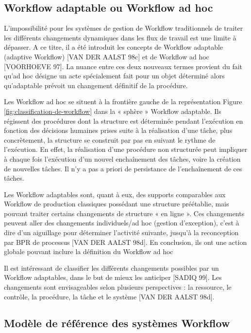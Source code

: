 \subsection{Workflow adaptable ou Workflow ad hoc }
L’impossibilité pour les systèmes de gestion de Workflow traditionnels de traiter les différents changements dynamiques dans les flux de travail est une limite à dépasser. A ce titre, il a été introduit les concepts de Workflow adaptable (adaptive Workflow) [VAN DER
AALST 98c] et de Workflow ad hoc [VOORHOEVE 97]. La nuance entre ces deux nouveaux termes provient du fait qu’ad hoc désigne un acte spécialement fait pour un objet déterminé alors qu’adaptable prévoit un changement définitif de la procédure. 

Les Workflow ad hoc se situent à la frontière gauche de la représentation Figure \ref{fig:classification-de-workflow} dans
la « sphère » Workflow adaptable. Ils régissent des procédures dont la structure est déterminée pendant l’exécution en fonction des décisions humaines prises suite à la réalisation d’une
tâche, plus concrètement, la structure se construit par pas en suivant le rythme de l’exécution. En effet, la réalisation d’une procédure non structurée peut impliquer à chaque fois l’exécution d’un nouvel enchaînement des tâches, voire la création de nouvelles tâches. Il n’y a pas a priori de persistance de l’enchaînement de ces tâches.

Les Workflow adaptables sont, quant à eux, des supports comparables aux Workflow de
production classiques possédant une structure préétablie, mais pouvant traiter certains changements de structure « en ligne ». Ces changements peuvent aller des changements individuels/ad hoc (gestion d’exception), c’est à dire d’un aiguillage pour déterminer l’activité suivante, jusqu'à la reconception par BPR de processus [VAN DER AALST 98d]. En conclusion, ils ont une action globale pouvant inclure la définition du Workflow ad hoc  

Il est intéressant de classifier les différents changements possibles par un Workflow adaptables, dans le but de mieux les anticiper [SADIQ 99]. Les changements sont envisageables
selon plusieurs perspectives : la ressource, le contrôle, la procédure, la tâche et le système [VAN DER AALST 98d].


\subsection{Modèle de référence des systèmes Workflow }


